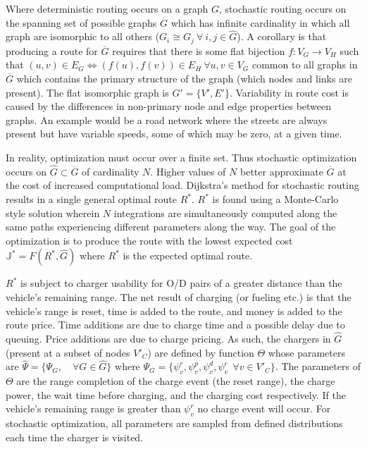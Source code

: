 \documentclass[12pt]{article}
\begin{document}
Where deterministic routing occurs on a graph $G$, stochastic routing occurs on the spanning set of possible graphs $\overline{G}$ which has infinite cardinality in which all graph are isomorphic to all others ($G_i \cong G_j \ \forall \ i,j \in\hat{G}$). A corollary is that producing a route for $\overline{G}$ requires that there is some flat bijection $f:V_G\rightarrow V_H$ such that $(u,v)\in E_G \iff (f(u),f(v))\in E_H\ \forall u, v \in V_G$ common to all graphs in $\overline{G}$ which contains the primary structure of the graph (which nodes and links are present). The flat isomorphic graph is $G' = \{V', E'\}$. Variability in route cost is caused by the differences in non-primary node and edge properties between graphs. An example would be a road network where the streets are always present but have variable speeds, some of which may be zero, at a given time.

In reality, optimization must occur over a finite set. Thus stochastic optimization occurs on $\hat{G}\subset\overline{G}$ of cardinality $N$. Higher values of $N$ better approximate $\overline{G}$ at the cost of increased computational load. Dijkstra's method for stochastic routing results in a single general optimal route $R^*$. $R^*$ is found using a Monte-Carlo style solution wherein $N$ integrations are simultaneously computed along the same paths experiencing different parameters along the way. The goal of the optimization is to produce the route with the lowest expected cost $\mathbb{J}^* = F(R^*,\hat{G})$ where $R^*$ is the expected optimal route.

$R^*$ is subject to charger usability for O/D pairs of a greater distance than the vehicle's remaining range. The net result of charging (or fueling etc.) is that the vehicle's range is reset, time is added to the route, and money is added to the route price. Time additions are due to charge time and a possible delay due to queuing. Price additions are due to charge pricing. As such, the chargers in $\hat{G}$ (present at a subset of nodes $V'_C$) are defined by function $\Theta$ whose parameters are $\hat{\Psi} = \{\Psi_G,\quad \forall G\in \hat{G}\}$ where $\Psi_G = \{\psi_v^r,\psi_v^p,\psi_v^d,\psi_v^c\ \ \forall v\in V'_C\}$. The parameters of $\Theta$ are the range completion of the charge event (the reset range), the charge power, the wait time before charging, and the charging cost respectively. If the vehicle's remaining range is greater than $\psi_v^r$ no charge event will occur. For stochastic optimization, all parameters are sampled from defined distributions each time the charger is visited.
\end{document}
